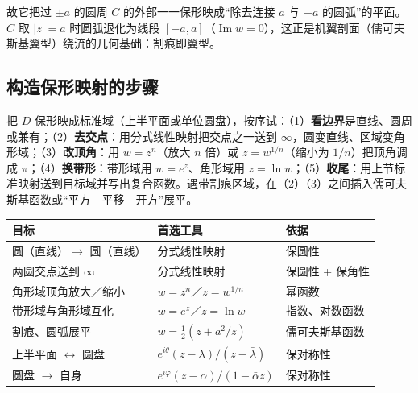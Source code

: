 故它把过 \(\pm a\) 的圆周 \(C\) 的外部一一保形映成“除去连接 \(a\) 与 \(-a\) 的圆弧”的平面。\(C\) 取 \(|z|=a\) 时圆弧退化为线段 \([-a,a]\)（\(\operatorname{Im}w=0\)），这正是机翼剖面（儒可夫斯基翼型）绕流的几何基础：割痕即翼型。

\subsection{构造保形映射的步骤}

把 \(D\) 保形映成标准域（上半平面或单位圆盘），按序试：（1）\textbf{看边界}是直线、圆周或兼有；（2）\textbf{去交点}：用分式线性映射把交点之一送到 \(\infty\)，圆变直线、区域变角形域；（3）\textbf{改顶角}：用 \(w=z^{n}\)（放大 \(n\) 倍）或 \(z=w^{1/n}\)（缩小为 \(1/n\)）把顶角调成 \(\pi\)；（4）\textbf{换带形}：带形域用 \(w=e^{z}\)、角形域用 \(z=\ln w\)；（5）\textbf{收尾}：用上节标准映射送到目标域并写出复合函数。遇带割痕区域，在（2）（3）之间插入儒可夫斯基函数或“平方—平移—开方”展平。

\begin{center}
\begin{tabular}{@{}lll@{}}
\toprule
目标 & 首选工具 & 依据 \\
\midrule
圆（直线）$\to$ 圆（直线） & 分式线性映射 & 保圆性 \\
两圆交点送到 \(\infty\) & 分式线性映射 & 保圆性 + 保角性 \\
角形域顶角放大／缩小 & \(w=z^{n}\)／\(z=w^{1/n}\) & 幂函数 \\
带形域与角形域互化 & \(w=e^{z}\)／\(z=\ln w\) & 指数、对数函数 \\
割痕、圆弧展平 & \(w=\frac{1}{2}(z+a^{2}/z)\) & 儒可夫斯基函数 \\
上半平面 $\leftrightarrow$ 圆盘 & \(e^{i\theta}(z-\lambda)/(z-\bar\lambda)\) & 保对称性 \\
圆盘 $\to$ 自身 & \(e^{i\varphi}(z-\alpha)/(1-\bar\alpha z)\) & 保对称性 \\
\bottomrule
\end{tabular}
\end{center}

